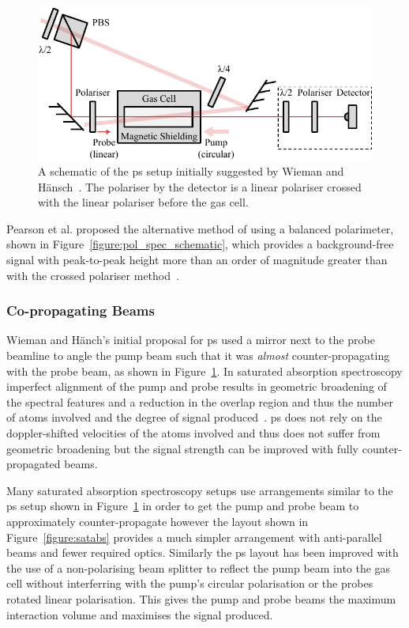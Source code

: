 \begin{figure}
\center
\includegraphics{part1/Figs/PolSpecWieman.pdf}
\caption{A schematic of the \gls{ps} setup initially suggested by Wieman and H\"ansch~\cite{wieman_doppler-free_1976}. The polariser by the detector is a linear polariser crossed with the linear polariser before the gas cell.}
\label{figure:wieman_doppler-free_schematic}
\end{figure}

Pearson et al. proposed the alternative method of using a balanced polarimeter, shown in Figure~\ref{figure:pol_spec_schematic}, which provides a background-free signal with peak-to-peak height more than an order of magnitude greater than with the crossed polariser method~\cite{pearman_polarization_2002,yoshikawa_frequency_2003}.

\subsubsection{Co-propagating Beams}

Wieman and H\"anch's initial proposal for \gls{ps} used a mirror next to the probe beamline to angle the pump beam such that it was \emph{almost} counter-propagating with the probe beam, as shown in Figure~\ref{figure:wieman_doppler-free_schematic}.
In saturated absorption spectroscopy imperfect alignment of the pump and probe results in geometric broadening of the spectral features and a reduction in the overlap region and thus the number of atoms involved and the degree of signal produced~\cite{himsworth_rubidium_2010}.
\Gls{ps} does not rely on the doppler-shifted velocities of the atoms involved and thus does not suffer from geometric broadening but the signal strength can be improved with fully counter-propagated beams.

Many saturated absorption spectroscopy setups use arrangements similar to the \gls{ps} setup shown in Figure~\ref{figure:wieman_doppler-free_schematic} in order to get the pump and probe beam to approximately counter-propagate however the layout shown in Figure~\ref{figure:satabs} provides a much simpler arrangement with anti-parallel beams and fewer required optics.
Similarly the \gls{ps} layout has been improved with the use of a non-polarising beam splitter to reflect the pump beam into the gas cell without interferring with the pump's circular polarisation or the probes rotated linear polarisation.
This gives the pump and probe beams the maximum interaction volume and maximises the signal produced.

